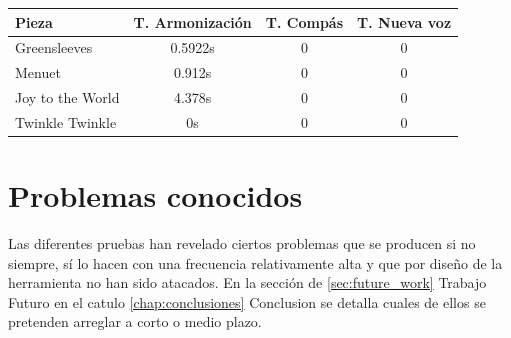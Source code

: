   \begin{center}
  	\begin{tabular}{ | l | c | c | c | }
  		\hline
  		Pieza & T. Armonización & T. Compás & T. Nueva voz \\ \hline \hline
  		Greensleeves & 0.5922s & 0 & 0 \\ \hline
  		Menuet & 0.912s & 0 & 0 \\ \hline
  		Joy to the World & 4.378s & 0 & 0 \\ \hline
  		Twinkle Twinkle & 0s & 0 & 0 \\ \hline
  	\end{tabular}
  \end{center}
  
  \section{Problemas conocidos}
  \label{sec:known_issues}
  Las diferentes pruebas han revelado ciertos problemas que se producen si no siempre, sí lo hacen con una frecuencia relativamente alta y que por diseño de la herramienta no han sido atacados. En la sección de \ref{sec:future_work} Trabajo Futuro en el catulo \ref{chap:conclusiones} Conclusion se detalla cuales de ellos se pretenden arreglar a corto o medio plazo.
  
